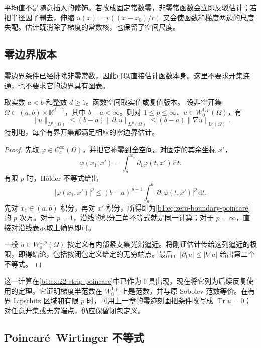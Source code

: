 \ProseParagraphBreak

平均值不是随意插入的修饰。若改成固定常数零，非零常函数会立即反驳估计；若把半径因子删去，伸缩 \(u(x)=v((x-x_0)/r)\) 又会使函数和梯度两边的尺度失配。估计既消除了梯度的常数核，也保留了空间尺度。

\subsection{零边界版本}
\label{b1:subsec:240102}

零边界条件已经排除非零常数，因此可以直接估计函数本身。这里不要求开集连通，也不要求它的边界具有图表。

\begin{theorem}\label{b1:thm:zero-boundary-poincare}
取实数 \(a<b\) 和整数 \(d\geq1\)。函数空间取实值或复值版本。
设非空开集 \(\Omega\subset(a,b)\times\mathbb R^{d-1}\)，其中 \(b-a<\infty\)。则对 \(1\le p\le\infty\)、\(u\in W_0^{1,p}(\Omega)\)，有
\begin{equation}\label{b1:eq:zero-boundary-poincare}
 \|u\|_{L^p(\Omega)}
 \le(b-a)\|\partial_1u\|_{L^p(\Omega)}
 \le(b-a)\|\nabla u\|_{L^p(\Omega)}.
\end{equation}
特别地，每个有界开集都满足相应的零边界估计。
\end{theorem}
\begin{proof}
先取 \(\varphi\in C_c^\infty(\Omega)\)，并把它补零到全空间。对固定的其余坐标 \(x'\)，
\[
 \varphi(x_1,x')=\int_a^{x_1}\partial_1\varphi(t,x')\,\mathrm dt.
\]
有限 \(p\) 时，Hölder 不等式给出
\[
 |\varphi(x_1,x')|^p
 \le(b-a)^{p-1}\int_a^b|\partial_1\varphi(t,x')|^p\,\mathrm dt.
\]
先对 \(x_1\in(a,b)\) 积分，再对 \(x'\) 积分，所得即为\eqref{b1:eq:zero-boundary-poincare}的 \(p\) 次方。对于 \(p=1\)，沿线的积分三角不等式就是同一计算；对于 \(p=\infty\)，直接对沿线表示取上确界即可。

一般 \(u\in W_0^{1,p}(\Omega)\) 按定义有内部紧支集光滑逼近。将刚证估计传给这列逼近的极限，即得结论，包括按闭包定义给定的无穷端点。最后，\(|\partial_1u|\le|\nabla u|\) 给出第二个不等式。
\end{proof}

这一计算在\cref{b1:ex:22-strip-poincare}中已作为工具出现，现在将它列为后续反复使用的定理。它证明梯度半范数在 \(W_0^{1,p}\) 上是范数，并与原 Sobolev 范数等价。在有界 Lipschitz 区域和有限 \(p\) 时，可用上一章的零迹刻画把条件改写成 \(\operatorname{Tr}u=0\)；对任意开集或无穷端点，仍应保留闭包定义。

\subsection{Poincaré–Wirtinger 不等式}
\label{b1:subsec:240103}

